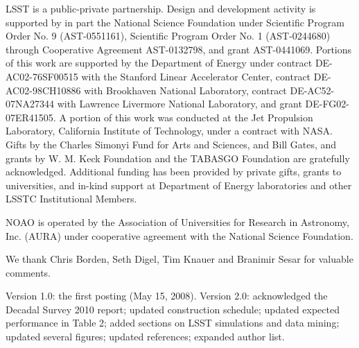\documentclass{emulateapj}
\begin{document}
LSST is a public-private partnership.  Design and development activity is
supported by in part the National Science Foundation under Scientific
Program Order No. 9 (AST-0551161), Scientific Program Order No. 1
(AST-0244680) through Cooperative Agreement AST-0132798, and grant AST-0441069. 
Portions of this work are supported by the Department of Energy under contract
DE-AC02-76SF00515 with the Stanford Linear Accelerator Center, contract
DE-AC02-98CH10886 with Brookhaven National Laboratory, contract
DE-AC52-07NA27344 with Lawrence Livermore National Laboratory, and grant
DE-FG02-07ER41505. A portion of this work was conducted at the Jet Propulsion 
Laboratory, California Institute of Technology, under a contract with NASA.
Gifts by the Charles Simonyi Fund for Arts and Sciences,
and Bill Gates, and grants by W. M. Keck Foundation and the TABASGO Foundation
are gratefully acknowledged. Additional funding has been provided by private gifts, grants 
to universities, and in-kind support at Department of Energy laboratories and other 
LSSTC Institutional Members.  

NOAO is operated by the Association of Universities for Research in Astronomy,
Inc. (AURA) under cooperative agreement with the National Science Foundation.

We thank Chris Borden, Seth Digel, Tim Knauer and Branimir Sesar for valuable 
comments.


\vskip 0.06in
Version 1.0: the first posting (May 15, 2008).
\vskip 0.06in
Version 2.0: acknowledged the Decadal Survey 2010 report; updated construction schedule;
updated expected performance in Table 2; added sections on LSST simulations and data mining;
updated several figures; updated references; expanded author list. 
\end{document}
